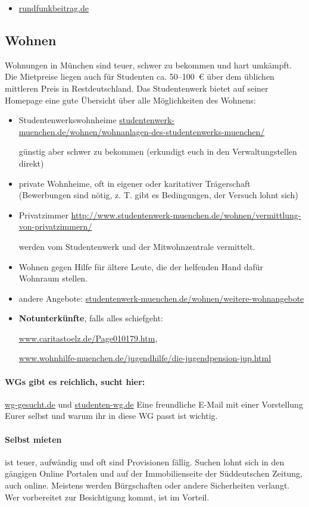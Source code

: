 \begin{itemize}
    \item \url{rundfunkbeitrag.de}
\end{itemize}

\subsection{Wohnen}
Wohnungen in München sind teuer, schwer zu bekommen und hart umkämpft. Die Mietpreise liegen
auch für Studenten ca. 50--100~€ über dem üblichen mittleren Preis in
Restdeutschland. Das Studentenwerk bietet auf seiner Homepage eine
gute Übersicht über alle Möglichkeiten des Wohnens:

\begin{itemize}
\item Studentenwerkswohnheime \newline \url{studentenwerk-muenchen.de/wohnen/wohnanlagen-des-studentenwerks-muenchen/}

  günstig aber schwer zu bekommen (erkundigt euch in den Verwaltungstellen direkt)
\item private Wohnheime, oft in eigener oder karitativer Trägerschaft
  (Bewerbungen sind nötig, z. T. gibt es Bedingungen, der Versuch lohnt sich)
\item
  Privatzimmer \newline \url{http://www.studentenwerk-muenchen.de/wohnen/vermittlung-von-privatzimmern/}
  
werden vom Studentenwerk und der Mitwohnzentrale vermittelt.
\item Wohnen gegen Hilfe für ältere Leute, die der helfenden Hand dafür
  Wohnraum stellen.
\item andere Angebote: \url{studentenwerk-muenchen.de/wohnen/weitere-wohnangebote}
\item {\bf Notunterkünfte}, falls alles schiefgeht:

 \url{www.caritastoelz.de/Page010179.htm},

  \url{www.wohnhilfe-muenchen.de/jugendhilfe/die-jugendpension-jup.html}
\end{itemize}

\paragraph{WGs gibt es reichlich, sucht hier:}
\url{wg-gesucht.de} und \url{studenten-wg.de}\newline
Eine freundliche E-Mail mit einer Vorstellung Eurer selbst und warum ihr
in diese WG passt ist wichtig.

\paragraph{Selbst mieten} ist teuer, aufwändig und oft sind Provisionen
fällig. Suchen
lohnt sich in den gängigen Online Portalen und auf der Immobilienseite der
Süddeutschen Zeitung, auch online. Meistens werden Bürgschaften oder andere
Sicherheiten verlangt.  Wer vorbereitet zur Besichtigung kommt, ist im Vorteil.
